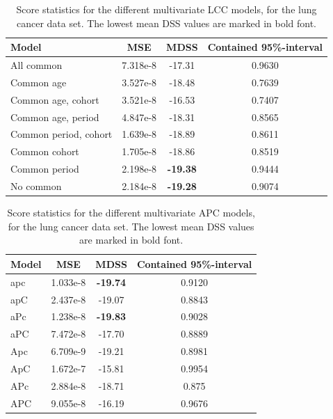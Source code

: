 \begin{table}
    \begin{center}
    \begin{tabular}{l |c c c }
        Model & MSE & MDSS & Contained 95\%-interval\\
        \hline
        All common          & 7.318e-8 & -17.31    & 0.9630 \\
        Common age          & 3.527e-8 & -18.48   & 0.7639 \\
        Common age, cohort  & 3.521e-8 & -16.53    & 0.7407 \\
        Common age, period  & 4.847e-8 & -18.31   & 0.8565 \\
        Common period, cohort & 1.639e-8 & -18.89    & 0.8611 \\
        Common cohort       & 1.705e-8 & -18.86  & 0.8519  \\
        Common period       & 2.198e-8 & \textbf{-19.38}   & 0.9444 \\
        No common           & 2.184e-8 & \textbf{-19.28}   & 0.9074 \\
    \end{tabular}
    \caption{Score statistics for the different multivariate LCC models, for the lung cancer data set. The lowest mean DSS values are marked in bold font. }\label{tbl:mv-LCC-lung}
    \end{center}
\end{table}

\begin{table}
    \begin{center}
    \begin{tabular}{l |c c c }
        Model & MSE & MDSS & Contained 95\%-interval\\
        \hline
        apc    & 1.033e-8 & \textbf{-19.74}    & 0.9120 \\
        apC    & 2.437e-8 & -19.07   & 0.8843 \\
        aPc    & 1.238e-8 & \textbf{-19.83}  & 0.9028 \\
        aPC    & 7.472e-8 & -17.70   & 0.8889 \\
        Apc    & 6.709e-9 & -19.21   & 0.8981 \\
        ApC    & 1.672e-7 & -15.81   & 0.9954 \\
        APc    & 2.884e-8 & -18.71   & 0.875  \\
        APC    & 9.055e-8 & -16.19   & 0.9676 \\
    \end{tabular}
    \caption{Score statistics for the different multivariate APC models, for the lung cancer data set. The lowest mean DSS values are marked in bold font. }\label{tbl:mv-APC-lung}
    \end{center}
\end{table}


